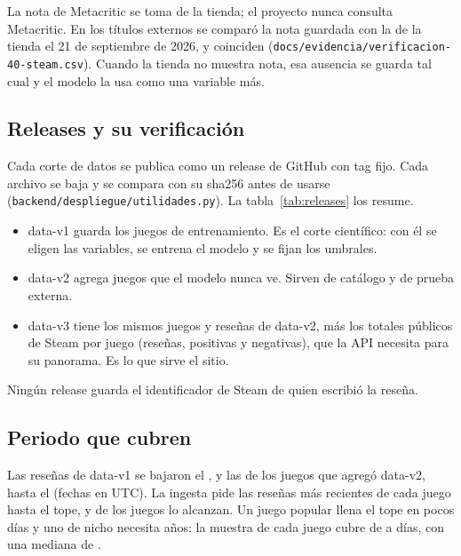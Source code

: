 La nota de Metacritic se toma de la tienda; el proyecto nunca consulta Metacritic. En los
\cifraJuegosExternos{} títulos externos se comparó la nota guardada con la de la tienda el 21
de septiembre de 2026, y coinciden \cifraMetacriticVerificadoExternos{}
(\texttt{docs/evidencia/verificacion-40-steam.csv}). Cuando la tienda no muestra nota, esa
ausencia se guarda tal cual y el modelo la usa como una variable más.

\subsection{Releases y su verificación}\label{sec:datos-releases}

Cada corte de datos se publica como un release de GitHub con tag fijo. Cada archivo se baja y
se compara con su sha256 antes de usarse (\texttt{backend/despliegue/utilidades.py}). La
tabla~\ref{tab:releases} los resume.

\begin{table}[htbp]
  \centering\small
  
  \caption{Releases de datos. El sha256 va recortado; el completo está en el anexo. Fuente: API
  de releases de GitHub y los archivos bajados.}
  \label{tab:releases}
\end{table}

\begin{itemize}
  \item data-v1 guarda los \cifraJuegosEntrenamiento{} juegos de entrenamiento. Es el
  corte científico: con él se eligen las variables, se entrena el modelo y se fijan los
  umbrales.
  \item data-v2 agrega \cifraJuegosExternos{} juegos que el modelo nunca ve. Sirven de
  catálogo y de prueba externa.
  \item data-v3 tiene los mismos \cifraJuegosCatalogo{} juegos y reseñas de data-v2,
  más los totales públicos de Steam por juego (reseñas, positivas y negativas), que la API
  necesita para su panorama. Es lo que sirve el sitio.
\end{itemize}

Ningún release guarda el identificador de Steam de quien escribió la reseña.

\subsection{Periodo que cubren}\label{sec:datos-periodo}

Las reseñas de data-v1 se bajaron el \cifraDescargaHastaEntrenamiento{}, y las de los juegos
que agregó data-v2, hasta el \cifraDescargaHastaCatalogo{} (fechas en UTC). La ingesta pide las
reseñas más recientes de cada juego hasta el tope, y \cifraJuegosEnElTope{} de los
\cifraJuegosEntrenamiento{} juegos lo alcanzan. Un juego popular llena el tope en pocos días y
uno de nicho necesita años: la muestra de cada juego cubre de \cifraDiasCubiertosMin{} a
\cifraDiasCubiertosMax{} días, con una mediana de \cifraDiasCubiertosMediana{}.

